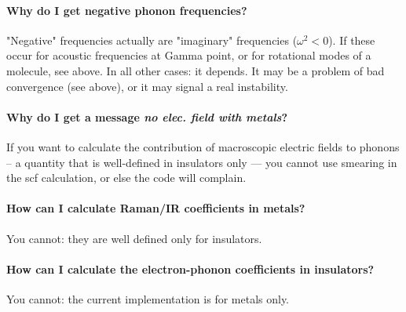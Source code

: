 \documentclass[12pt,a4paper]{article}
\begin{document}
\paragraph{Why do I get negative phonon frequencies? }

"Negative" frequencies actually are "imaginary" frequencies 
($\omega^2<0$). If these occur for acoustic frequencies at Gamma point, 
or for rotational modes of a molecule, see above.
In all other cases: it depends. It may be a problem of bad
convergence (see above), or it may signal a real instability.

\paragraph{Why do I get a message {\em no elec. field with metals}? }

If you want to calculate the contribution of macroscopic electric 
fields to phonons -- a quantity that is well-defined in insulators 
only --- you cannot use smearing in the scf calculation, or else the
code will complain. 

\paragraph{How can I calculate Raman/IR coefficients in metals?}

You cannot: they are well defined only for insulators.

\paragraph{How can I calculate the electron-phonon coefficients
in insulators?}

You cannot: the current implementation is for metals only.
\end{document}
